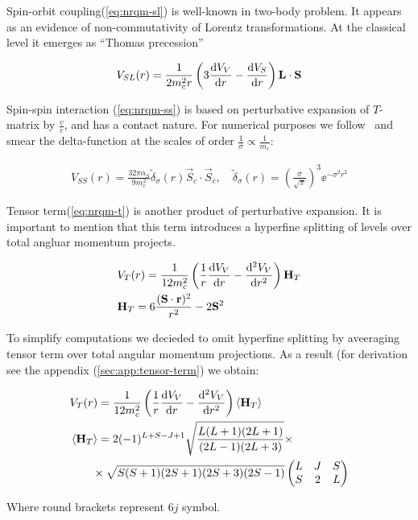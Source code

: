 Spin-orbit coupling(\cref{eq:nrqm-sl}) is well-known in two-body problem. It appears as an evidence of non-commutativity of Lorentz transformations. At the classical level it emerges as ``Thomas precession''~\cite{thomas}

\begin{align} \label{eq:nrqm-sl}
    V_{SL}(r) = \frac{1}{2 m_c^2 r} \left( 3 \dv{V_V}{r} - \dv{V_S}{r} \right) \mathbf{L} \cdot \mathbf{S}
\end{align}

Spin-spin interaction (\cref{eq:nrqm-ss}) is based on perturbative expansion of $T$-matrix by $\frac{v}{c}$, and has a contact nature. For numerical purposes we follow~\cite{gbs-model} and smear the delta-function at the scales of order $\frac{1}{\sigma} \propto \frac{1}{m_c}$:

\begin{align} \label{eq:nrqm-ss}
    V_{SS}(r) = \frac{32 \pi \alpha_S}{9 m_c^2} \tilde{\delta}_\sigma(r) \vec{S}_c \cdot \vec{S}_{\bar{c}},\quad \tilde{\delta}_\sigma(r) = \left(\frac{\sigma}{\sqrt{\pi}}\right)^3 \ee^{-\sigma^2 r^2}
\end{align}

Tensor term(\cref{eq:nrqm-t}) is another product of perturbative expansion. It is important to mention that this term introduces a hyperfine splitting of levels over total angluar momentum projects.

\begin{align} \label{eq:nrqm-t}
    &V_T(r) = \frac{1}{12 m_c^2} \left( \frac{1}{r} \dv{V_V}{r} - \dv[2]{V_V}{r} \right) \mathbf{H}_T \\
    &\mathbf{H}_T = 6\frac{(\mathbf{S} \cdot \mathbf{r})^2}{r^2} - 2\mathbf{S}^2
\end{align}

To simplify computations we decieded to omit hyperfine splitting by aveeraging tensor term over total angular momentum projections. As a result (for derivation see the appendix (\cref{sec:app:tensor-term}) we obtain:

\begin{align}
    &V_T(r) = \frac{1}{12 m_c^2} \left( \frac{1}{r} \dv{V_V}{r} - \dv[2]{V_V}{r} \right) \left<\mathbf{H}_T\right> \\
    &\left<\mathbf{H}_T\right> = 2 (-1)^{L+S-J+1} \sqrt{\frac{L(L+1)(2L+1)}{(2L-1)(2L+3)}} \times \nonumber \\
    &\qquad \times \sqrt{S(S+1)(2S+1)(2S+3)(2S-1)} \left( \begin{matrix}
                                                L & J & S \\
                                                S & 2 & L
                                              \end{matrix} \right)
\end{align}

Where round brackets represent $6j$ symbol.

